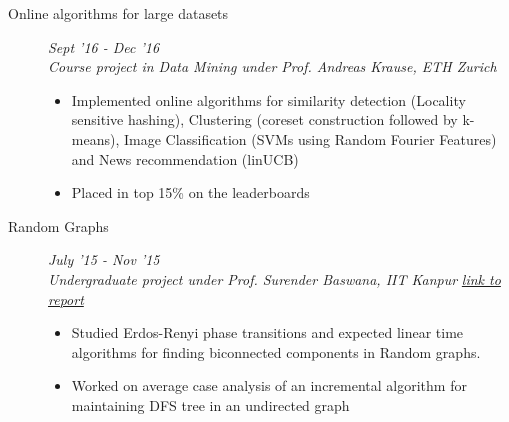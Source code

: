 \documentclass[9pt]{article}
\newenvironment{changemargin}[2]{%
  \begin{list}{}{%
    \setlength{\topsep}{0pt}%
    \setlength{\leftmargin}{#1}%
    \setlength{\rightmargin}{#2}%
    \setlength{\listparindent}{\parindent}%
    \setlength{\itemindent}{\parindent}%
    \setlength{\parsep}{\parskip}%
  }%
  \item[]}{\end{list}
}
\newenvironment{body} {
	\vspace*{-16pt}
	\begin{changemargin}{-0.6in}{-0.65in}
  }	
	{\end{changemargin}
}
\begin{document}
\begin{body}
\begin{description}
	 \item[\normalsize{Online algorithms for large datasets}] \hfill  \textit{Sept '16 - Dec '16} \\
           \textit{Course project in Data Mining under Prof. Andreas Krause, ETH Zurich}
	  \begin{itemize}
            \item Implemented online algorithms for similarity detection (Locality sensitive hashing), Clustering 
              (coreset construction followed by k-means), Image Classification (SVMs using Random Fourier Features) and 
              News recommendation (linUCB) 
            \item Placed in top 15\% on the leaderboards
	  \end{itemize}


            \pagebreak
	  \item[\normalsize{Random Graphs}]	\hfill 	\textit{July '15 - Nov '15} \\
            \textit{Undergraduate project under Prof. Surender Baswana, IIT Kanpur} 
            \hfill \href{http://home.iitk.ac.in/~sshekh/cs498a/report.pdf}{\textit{\textcolor{ProcessBlue}{link to report}}}
	  \begin{itemize}
	   \item Studied Erdos-Renyi phase transitions and expected linear time algorithms for finding 
                biconnected components in Random graphs.
	   \item Worked on average case analysis of an incremental algorithm for maintaining DFS tree in an undirected graph 
	  \end{itemize}
	  

\end{description}
\end{body}
\end{document}
